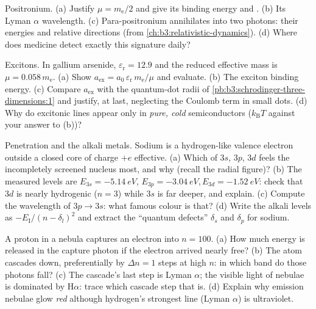 \begin{exercise}[$\star\star$]\label{exo:b3:hydrogen-atom:6}
Positronium. (a) Justify $\mu = m_{\text{e}}/2$ and give its
binding energy and . (b) Its Lyman $\alpha$ wavelength.
(c) Para-positronium annihilates into two photons: their energies
and relative directions (from \cref{ch:b3:relativistic-dynamics}).
(d) Where does medicine detect exactly this signature daily?
\end{exercise}

\begin{exercise}[$\star\star$]\label{exo:b3:hydrogen-atom:7}
Excitons. In gallium arsenide, $\varepsilon_{\text{r}} = 12.9$ and
the reduced effective mass is $\mu = 0.058\,m_{\text{e}}$. (a) Show
$a_{\text{ex}} = a_0\,\varepsilon_{\text{r}}\,m_{\text{e}}/\mu$ and
evaluate. (b) The exciton binding energy. (c) Compare
$a_{\text{ex}}$ with the quantum-dot radii of
\cref{pb:b3:schrodinger-three-dimensions:1} and justify, at last,
neglecting the Coulomb term in small dots. (d) Why do excitonic
lines appear only in \emph{pure, cold} semiconductors
($k_{\text{B}}T$ against your answer to (b))?
\end{exercise}

\begin{exercise}[$\star\star$]\label{exo:b3:hydrogen-atom:8}
Penetration and the alkali metals. Sodium is a hydrogen-like
valence electron outside a closed core of charge $+e$ effective.
(a) Which of $3s$, $3p$, $3d$ feels the incompletely screened
nucleus most, and why (recall the radial figure)? (b) The measured
levels are $E_{3s} = \qty{-5.14}{eV}$, $E_{3p} = \qty{-3.04}{eV},
E_{3d} = \qty{-1.52}{eV}$: check that $3d$ is nearly hydrogenic
($n = 3$) while $3s$ is far deeper, and explain. (c) Compute the
wavelength of $3p \to 3s$: what famous colour is that? (d) Write
the alkali levels as $-E_{\text{I}}/(n - \delta_l)^2$ and extract
the ``quantum defects'' $\delta_s$ and $\delta_p$ for sodium.
\end{exercise}

\begin{exercise}[$\star\star$]\label{exo:b3:hydrogen-atom:9}
A proton in a nebula captures an electron into $n = 100$. (a) How
much energy is released in the capture photon if the electron
arrived nearly free? (b) The atom cascades down, preferentially by
$\Delta n = 1$ steps at high $n$: in which band do those photons
fall? (c) The cascade's last step is Lyman $\alpha$; the visible
light of nebulae is dominated by H$\alpha$: trace which cascade
step that is. (d) Explain why emission nebulae glow \emph{red}
although hydrogen's strongest line (Lyman $\alpha$) is
ultraviolet.
\end{exercise}

